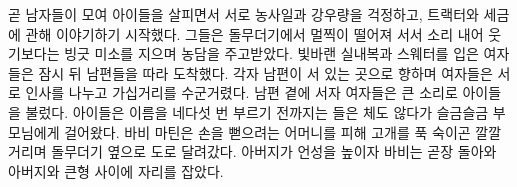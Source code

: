 \documentclass{translation}
\begin{document}
곧 남자들이 모여 아이들을 살피면서 서로 농사일과 강우량을 걱정하고, 트랙터와 세금에 관해 이야기하기 시작했다.
그들은 돌무더기에서 멀찍이 떨어져 서서 소리 내어 웃기보다는 빙긋 미소를 지으며 농담을 주고받았다.
빛바랜 실내복과 스웨터를 입은 여자들은 잠시 뒤 남편들을 따라 도착했다.
각자 남편이 서 있는 곳으로 향하며 여자들은 서로 인사를 나누고 가십거리를 수군거렸다.
남편 곁에 서자 여자들은 큰 소리로 아이들을 불렀다.
아이들은 이름을 네다섯 번 부르기 전까지는 들은 체도 않다가 슬금슬금 부모님에게 걸어왔다.
바비 마틴은 손을 뻗으려는 어머니를 피해 고개를 푹 숙이곤 깔깔거리며 돌무더기 옆으로 도로 달려갔다.
아버지가 언성을 높이자 바비는 곧장 돌아와 아버지와 큰형 사이에 자리를 잡았다.
% 
\end{document}

